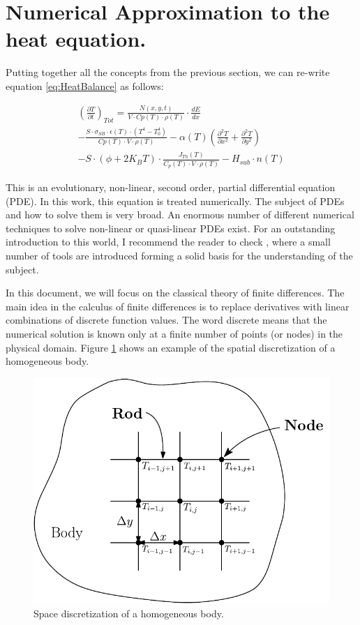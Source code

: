 \section{Numerical Approximation to the heat equation.}

Putting together all the concepts from the previous section, we can re-write equation \ref{eq:HeatBalance} as follows: 

\begin{multline}
    \left(\frac{\partial T}{\partial t}\right)_{Tot} = 
    \frac{N(x,y,t)}{V\cdot Cp(T) \cdot \rho (T) }\cdot \frac{dE}{dx} \\
    - \frac{S\cdot \sigma_{SB}\cdot \epsilon(T)\cdot \left(T^4 - T_0^4\right)}{Cp(T)\cdot V \cdot \rho(T)} 
        -\alpha (T) \left( \frac{\partial^2 T}{\partial x^2} + \frac{\partial^2 T}{\partial y^2} \right)  \\
        - S\cdot \left( \phi +2K_B T\right)\cdot \frac{J_{Th}(T)}{C_p(T)\cdot V \cdot \rho(T)} - H_{sub} \cdot n(T)
    \label{eq:ExplicitHeatEq}
\end{multline}

This is an evolutionary, non-linear, second order, partial differential equation (PDE). In this work, this equation is treated numerically. The subject of PDEs and how to solve them is very broad. An enormous number of different numerical techniques to solve non-linear or quasi-linear PDEs exist. For an outstanding introduction to this world, I recommend the reader to check \parencite[][]{ref:NumericalMethodBook}, where a small number of tools are introduced forming a solid basis for the understanding of the subject. 

In this document, we will focus on the classical theory of finite differences. The main idea in the calculus of finite differences is to replace derivatives with linear combinations of discrete function values. The word discrete means that the numerical solution is known only at a finite number of points (or nodes) in the physical domain. Figure \ref{fig:SpaceDiscret} shows an example of the spatial discretization of a homogeneous body. 

\begin{figure}[h]
    \centering
    \includegraphics[width=0.5\columnwidth]{SpaceDiscretization/SpaceDiscretization.pdf}
    \caption{Space discretization of a homogeneous body.}
    \label{fig:SpaceDiscret}
\end{figure}

